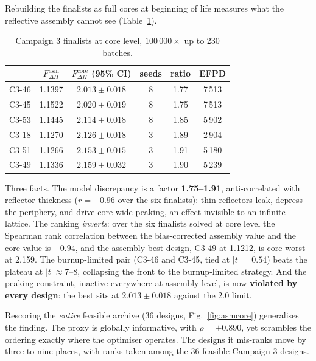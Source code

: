 Rebuilding the finalists as full cores at beginning of life measures
what the reflective assembly cannot see
(Table~\ref{tab:core-finalists}).

\begin{table}[htbp]
  \centering
  \caption{Campaign 3 finalists at core level, $100\,000\times$ up to 230 batches.}
  \label{tab:core-finalists}
  \begin{tabular}{lccccc}
    \toprule
    & $F_{\Delta H}^\mathrm{asm}$ & $F_{\Delta H}^\mathrm{core}$
      (95\% CI) & seeds & ratio & EFPD \\
    \midrule
    C3-46 & 1.1397 & $2.013\pm0.018$ & 8 & 1.77 & 7\,513 \\
    C3-45 & 1.1522 & $2.020\pm0.019$ & 8 & 1.75 & 7\,513 \\
    C3-53 & 1.1445 & $2.114\pm0.018$ & 8 & 1.85 & 5\,902 \\
    C3-18 & 1.1270 & $2.126\pm0.018$ & 3 & 1.89 & 2\,904 \\
    C3-51 & 1.1266 & $2.153\pm0.015$ & 3 & 1.91 & 5\,180 \\
    C3-49 & 1.1336 & $2.159\pm0.032$ & 3 & 1.90 & 5\,239 \\
    \bottomrule
  \end{tabular}
\end{table}

Three facts. The model discrepancy is a factor \textbf{1.75--1.91},
anti-correlated with reflector thickness ($r=-0.96$ over the six
finalists): thin reflectors leak, depress the periphery, and drive
core-wide peaking, an effect invisible to an infinite lattice. The ranking
\emph{inverts}: over the six finalists solved at core level the Spearman
rank correlation between the bias-corrected assembly value and the core
value is $-0.94$, and the assembly-best design, C3-49 at
\num{1.1212}, is core-worst at \num{2.159}. The burnup-limited
pair (C3-46 and C3-45, tied at $|t|=0.54$) beats the plateau at
$|t|\approx7$--$8$, collapsing the front to the burnup-limited strategy. And the
peaking constraint, inactive everywhere at assembly level, is now
\textbf{violated by every design}: the best sits at
$2.013\pm0.018$ against the 2.0 limit.

Rescoring the \emph{entire} feasible archive (36 designs,
Fig.~\ref{fig:asmcore}) generalises the finding. The proxy is globally
informative, with $\rho=+0.890$, yet scrambles the ordering exactly where
the optimiser operates. The designs it mis-ranks move by three to nine places, with ranks taken
among
the 36 feasible Campaign 3 designs.

